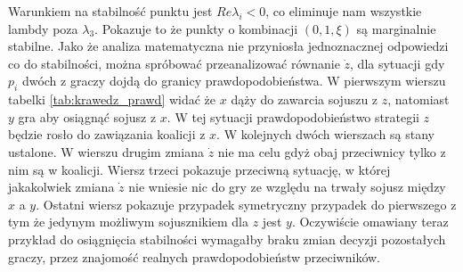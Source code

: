 Warunkiem na stabilność punktu jest $Re \lambda_i < 0$, co eliminuje nam wszystkie lambdy poza $\lambda_3$. Pokazuje to że punkty o kombinacji $(0,1,\xi)$ są marginalnie stabilne.
Jako że analiza matematyczna nie przyniosła jednoznacznej odpowiedzi co do stabilności, można spróbować przeanalizować równanie $\dot{z}$, dla sytuacji gdy $p_i$ dwóch z graczy dojdą do granicy prawdopodobieństwa.
W pierwszym wierszu tabelki \ref{tab:krawedz_prawd} widać że $x$ dąży do zawarcia sojuszu z $z$, natomiast $y$ gra aby osiągnąć sojusz z $x$. W tej sytuacji prawdopodobieństwo strategii $z$ będzie rosło do zawiązania koalicji z $x$. W kolejnych dwóch wierszach są stany ustalone. W wierszu drugim zmiana $\dot{z}$ nie ma celu gdyż obaj przeciwnicy tylko z nim są w koalicji. Wiersz trzeci pokazuje przeciwną sytuację, w której jakakolwiek zmiana $\dot{z}$ nie wniesie nic do gry ze względu na trwały sojusz między $x$ a $y$. Ostatni wiersz pokazuje przypadek symetryczny przypadek do pierwszego z tym że jedynym możliwym sojusznikiem dla $z$ jest $y$. Oczywiście omawiany teraz przykład do osiągnięcia stabilności wymagałby braku zmian decyzji pozostałych graczy, przez znajomość realnych prawdopodobieństw przeciwników.

